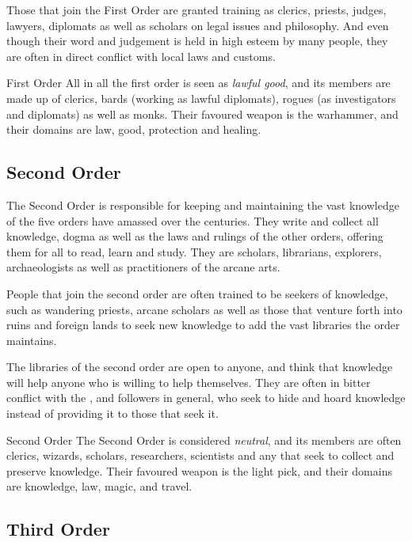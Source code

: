 Those that join the First Order are granted training as clerics, priests,
judges, lawyers, diplomats as well as scholars on legal issues and
philosophy. And even though their word and judgement is held in high esteem by
many people, they are often in direct conflict with local laws and customs.

\begin{35e}{First Order}
  All in all the first order is seen as \emph{lawful good}, and its members
  are made up of clerics, bards (working as lawful diplomats), rogues (as
  investigators and diplomats) as well as monks. Their favoured weapon is the
  warhammer, and their domains are law, good, protection and healing.
\end{35e}

\subsection{Second Order}
\label{sec:Second Order}

The Second Order is responsible for keeping and maintaining the vast knowledge
of the five orders have amassed over the centuries. They write and collect all
knowledge, dogma as well as the laws and rulings of the other orders, offering
them for all to read, learn and study. They are scholars, librarians,
explorers, archaeologists as well as practitioners of the arcane arts.

People that join the second order are often trained to be seekers of
knowledge, such as wandering priests, arcane scholars as well as those that
venture forth into ruins and foreign lands to seek new knowledge to add the
vast libraries the order maintains.

The libraries of the second order are open to anyone, and think that knowledge
will help anyone who is willing to help themselves. They are often in bitter
conflict with the , and 
followers in general, who seek to hide and hoard knowledge instead of
providing it to those that seek it.

\begin{35e}{Second Order}
  The Second Order is considered \emph{neutral}, and its members are often
  clerics, wizards, scholars, researchers, scientists and any that seek to
  collect and preserve knowledge. Their favoured weapon is the light pick,
  and their domains are knowledge, law, magic, and travel.
\end{35e}

\subsection{Third Order}
\label{sec:Third Order}

